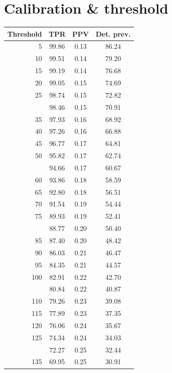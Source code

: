 \documentclass[12pt]{article}
\begin{document}
\section*{Calibration \& threshold}


\begin{minipage}{0.5\textwidth}\small
\begin{tabular}{rccc}
\toprule
\textbf{Threshold} & \textbf{TPR} 
& \textbf{PPV} & \textbf{Det. prev.} \\
\midrule

    5 & 99.86 & 0.13 & 86.24 \\ 
     10 & 99.51 & 0.14 & 79.20 \\ 
     15 & 99.19 & 0.14 & 76.68 \\ 
     20 & 99.05 & 0.15 & 74.69 \\ 
     25 & 98.74 & 0.15 & 72.82 \\ \addlinespace
     30 & 98.46 & 0.15 & 70.91 \\ 
     35 & 97.93 & 0.16 & 68.92 \\ 
     40 & 97.26 & 0.16 & 66.88 \\ 
     45 & 96.77 & 0.17 & 64.81 \\ 
     50 & 95.82 & 0.17 & 62.74 \\  \addlinespace
     55 & 94.66 & 0.17 & 60.67 \\ 
     60 & 93.86 & 0.18 & 58.59 \\ 
     65 & 92.80 & 0.18 & 56.51 \\ 
     70 & 91.54 & 0.19 & 54.44 \\ 
     75 & 89.93 & 0.19 & 52.41 \\  \addlinespace
     80 & 88.77 & 0.20 & 50.40 \\ 
     85 & 87.40 & 0.20 & 48.42 \\ 
     90 & 86.03 & 0.21 & 46.47 \\ 
     95 & 84.35 & 0.21 & 44.57 \\ 
    100 & 82.91 & 0.22 & 42.70 \\  \addlinespace
    105 & 80.84 & 0.22 & 40.87 \\ 
    110 & 79.26 & 0.23 & 39.08 \\ 
    115 & 77.89 & 0.23 & 37.35 \\ 
    120 & 76.06 & 0.24 & 35.67 \\ 
    125 & 74.34 & 0.24 & 34.03 \\  \addlinespace
    130 & 72.27 & 0.25 & 32.44 \\ 
    135 & 69.95 & 0.25 & 30.91 \\ 

\end{tabular}
\end{minipage}
\end{document}
